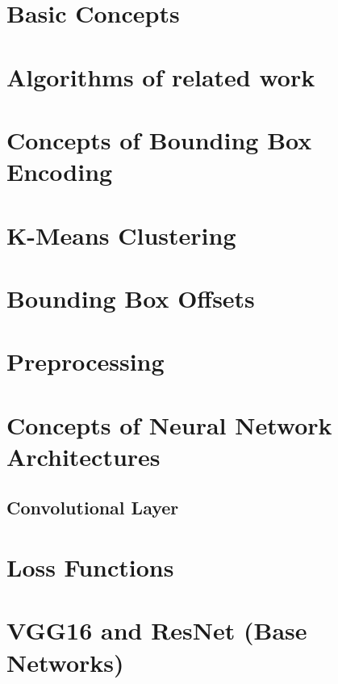 \appendix

\section{Basic Concepts}

\section{Algorithms of related work}

\section{Concepts of Bounding Box Encoding}\label{append:Concepts of Bounding Box Encoding}



\section{K-Means Clustering}\label{append:K-Means Clustering}

\section{Bounding Box Offsets}

\section{Preprocessing}

\section{Concepts of Neural Network Architectures}
\subsection{Convolutional Layer}\label{append:Convolutional Layer}


\section{Loss Functions}

\section{VGG16 and ResNet (Base Networks)}


